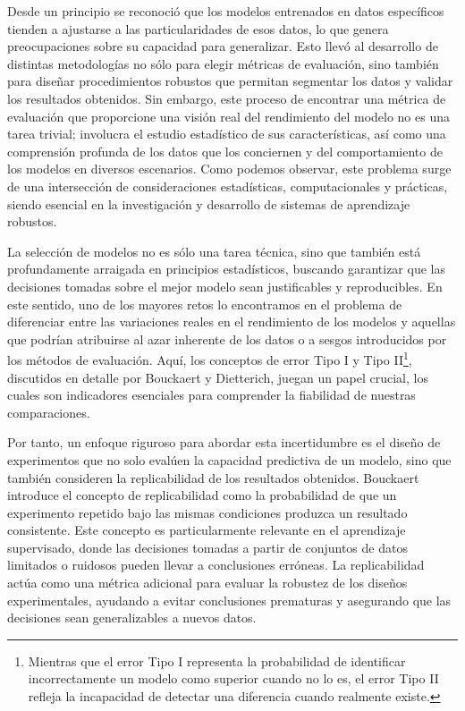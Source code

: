 \documentclass[a4paper,12pt]{article}
\begin{document}
Desde un principio se reconoció que los modelos entrenados en datos específicos tienden a ajustarse a las particularidades de esos datos, lo que genera preocupaciones sobre su capacidad para generalizar. Esto llevó al desarrollo de distintas metodologías no sólo para elegir métricas de evaluación, sino también para diseñar procedimientos robustos que permitan segmentar los datos y validar los resultados obtenidos. Sin embargo, este proceso de encontrar una métrica de evaluación que proporcione una visión real del rendimiento del modelo no es una tarea trivial; involucra el estudio estadístico de sus características, así como una comprensión profunda de los datos que los conciernen y del comportamiento de los modelos en diversos escenarios. Como podemos observar, este problema surge de una intersección de consideraciones estadísticas, computacionales y prácticas, siendo esencial en la investigación y desarrollo de sistemas de aprendizaje robustos.

La selección de modelos no es sólo una tarea técnica, sino que también está profundamente arraigada en principios estadísticos, buscando garantizar que las decisiones tomadas sobre el mejor modelo sean justificables y reproducibles. En este sentido, uno de los mayores retos lo encontramos en el problema de diferenciar entre las variaciones reales en el rendimiento de los modelos y aquellas que podrían atribuirse al azar inherente de los datos o a sesgos introducidos por los métodos de evaluación. Aquí, los conceptos de error Tipo I y Tipo II\footnote{Mientras que el error Tipo I representa la probabilidad de identificar incorrectamente un modelo como superior cuando no lo es, el error Tipo II refleja la incapacidad de detectar una diferencia cuando realmente existe. }, discutidos en detalle por Bouckaert y Dietterich, juegan un papel crucial\cite{dietterich1998approximate}, los cuales son indicadores esenciales para comprender la fiabilidad de nuestras comparaciones.

Por tanto, un enfoque riguroso para abordar esta incertidumbre es el diseño de experimentos que no solo evalúen la capacidad predictiva de un modelo, sino que también consideren la replicabilidad de los resultados obtenidos. Bouckaert introduce el concepto de replicabilidad como la probabilidad de que un experimento repetido bajo las mismas condiciones produzca un resultado consistente\cite{bouckaert2004estimating}. Este concepto es particularmente relevante en el aprendizaje supervisado, donde las decisiones tomadas a partir de conjuntos de datos limitados o ruidosos pueden llevar a conclusiones erróneas. La replicabilidad actúa como una métrica adicional para evaluar la robustez de los diseños experimentales, ayudando a evitar conclusiones prematuras y asegurando que las decisiones sean generalizables a nuevos datos.
\end{document}

